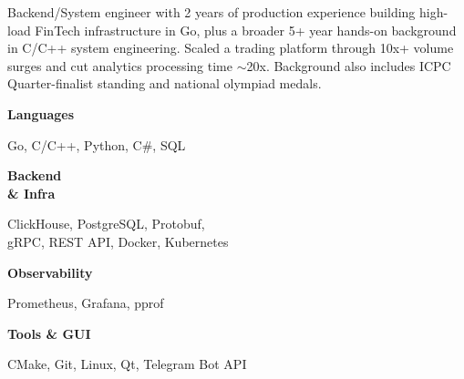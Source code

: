 \documentclass[9pt]{developercv} %
\begin{document}

\begin{minipage}[t]{0.46\textwidth}
	\vspace{-6pt}
 
	Backend/System engineer with 2 years of production experience building high-load FinTech infrastructure in Go, plus a broader 5+ year hands-on background in C/C++ system engineering. Scaled a trading platform through 10x+ volume surges and cut analytics processing time $\sim$20x. Background also includes ICPC Quarter-finalist standing and national olympiad medals. \\
\end{minipage}
\hfill %
\begin{minipage}[t]{0.4875\textwidth}
    \vspace{-6pt}
    
    \begin{minipage}[t]{0.23\textwidth}
        \textbf{Languages}
    \end{minipage}
    \hfill
    \begin{minipage}[t]{0.7\textwidth}
      Go, C/C++, Python, C\#, SQL 
    \end{minipage}
    \vspace{2.5mm}
    
    \begin{minipage}[t]{0.23\textwidth}
        \textbf{Backend \\ \& Infra}
    \end{minipage}
    \hfill
    \begin{minipage}[t]{0.7\textwidth}
      ClickHouse, PostgreSQL, Protobuf, \\ gRPC, REST API, Docker, Kubernetes
    \end{minipage}
    \vspace{2.5mm}
    
    \begin{minipage}[t]{0.23\textwidth}
        \textbf{Observability}
    \end{minipage}
    \hfill
    \begin{minipage}[t]{0.7\textwidth}
      Prometheus, Grafana, pprof
    \end{minipage}
    \vspace{2.5mm}
    
    \begin{minipage}[t]{0.23\textwidth}
        \textbf{Tools \& GUI}
    \end{minipage}
    \hfill
    \begin{minipage}[t]{0.7\textwidth}
      CMake, Git, Linux, Qt, Telegram Bot API
    \end{minipage}
    
\end{minipage}
\end{document}
